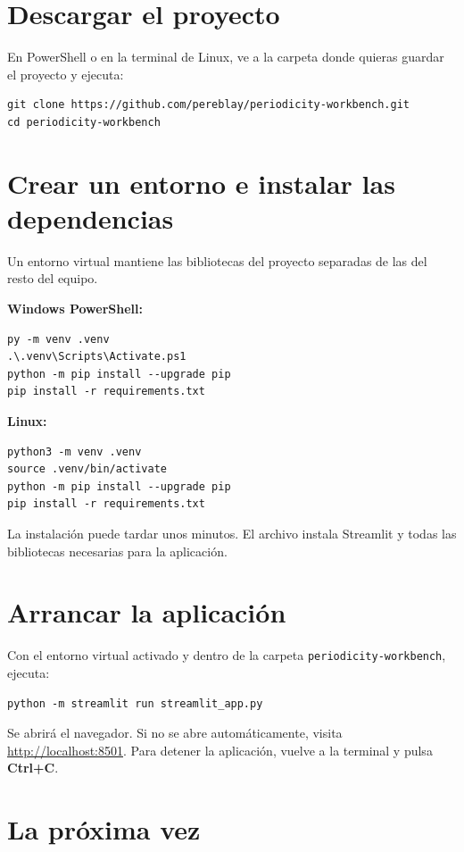 \documentclass[11pt,a4paper]{article}
\begin{document}
\section{Descargar el proyecto}

En PowerShell o en la terminal de Linux, ve a la carpeta donde quieras guardar el proyecto y ejecuta:

\begin{lstlisting}
git clone https://github.com/pereblay/periodicity-workbench.git
cd periodicity-workbench
\end{lstlisting}

\section{Crear un entorno e instalar las dependencias}

Un entorno virtual mantiene las bibliotecas del proyecto separadas de las del resto del equipo.

\textbf{Windows PowerShell:}
\begin{lstlisting}
py -m venv .venv
.\.venv\Scripts\Activate.ps1
python -m pip install --upgrade pip
pip install -r requirements.txt
\end{lstlisting}

\textbf{Linux:}
\begin{lstlisting}
python3 -m venv .venv
source .venv/bin/activate
python -m pip install --upgrade pip
pip install -r requirements.txt
\end{lstlisting}

La instalación puede tardar unos minutos. El archivo instala Streamlit y todas las bibliotecas necesarias para la aplicación.

\section{Arrancar la aplicación}

Con el entorno virtual activado y dentro de la carpeta \texttt{periodicity-workbench}, ejecuta:

\begin{lstlisting}
python -m streamlit run streamlit_app.py
\end{lstlisting}

Se abrirá el navegador. Si no se abre automáticamente, visita \href{http://localhost:8501}{http://localhost:8501}. Para detener la aplicación, vuelve a la terminal y pulsa \textbf{Ctrl+C}.

\section{La próxima vez}
\end{document}
